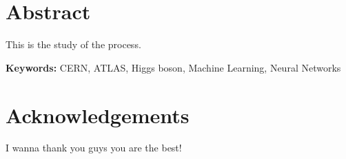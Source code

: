 \chapter*{Abstract}

This is the study of the \ttH process.

\vspace{3mm}
\noindent
\textbf{Keywords:}
CERN, ATLAS, Higgs boson, Machine Learning, Neural Networks







\newpage
\chapter*{Acknowledgements}

I wanna thank you guys you are the best!